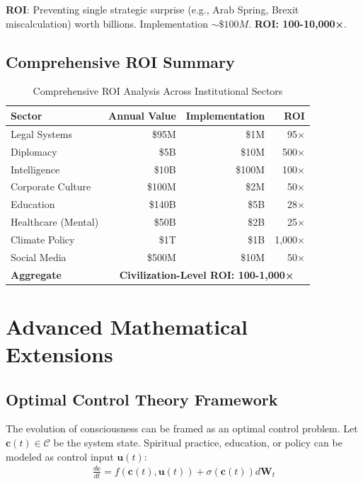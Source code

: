 \documentclass[11pt,a4paper]{article}
\theoremstyle{definition}
\theoremstyle{remark}
\newcommand{\CC}{\mathcal{C}}
\newcommand{\cc}{\mathbf{c}}
\begin{document}
\textbf{ROI}: Preventing single strategic surprise (e.g., Arab Spring, Brexit miscalculation) worth billions. Implementation \(\sim\$100M\). \textbf{ROI: 100-10,000×}.

\subsection{Comprehensive ROI Summary}

\begin{table}[h!]
\centering
\begin{tabular}{|l|r|r|r|}
\hline
\textbf{Sector} & \textbf{Annual Value} & \textbf{Implementation} & \textbf{ROI} \\
\hline
Legal Systems & \$95M & \$1M & 95× \\
Diplomacy & \$5B & \$10M & 500× \\
Intelligence & \$10B & \$100M & 100× \\
Corporate Culture & \$100M & \$2M & 50× \\
Education & \$140B & \$5B & 28× \\
Healthcare (Mental) & \$50B & \$2B & 25× \\
Climate Policy & \$1T & \$1B & 1,000× \\
Social Media & \$500M & \$10M & 50× \\
\hline
\textbf{Aggregate} & \multicolumn{3}{|c|}{\textbf{Civilization-Level ROI: 100-1,000×}} \\
\hline
\end{tabular}
\caption{Comprehensive ROI Analysis Across Institutional Sectors}
\end{table}

\section{Advanced Mathematical Extensions}

\subsection{Optimal Control Theory Framework}

The evolution of consciousness can be framed as an optimal control problem. Let \(\cc(t) \in \CC\) be the system state. Spiritual practice, education, or policy can be modeled as control input \(\mathbf{u}(t)\):
\begin{align}
    \frac{d\cc}{dt} = f(\cc(t), \mathbf{u}(t)) + \sigma(\cc(t)) d\mathbf{W}_t
\end{align}
\end{document}
